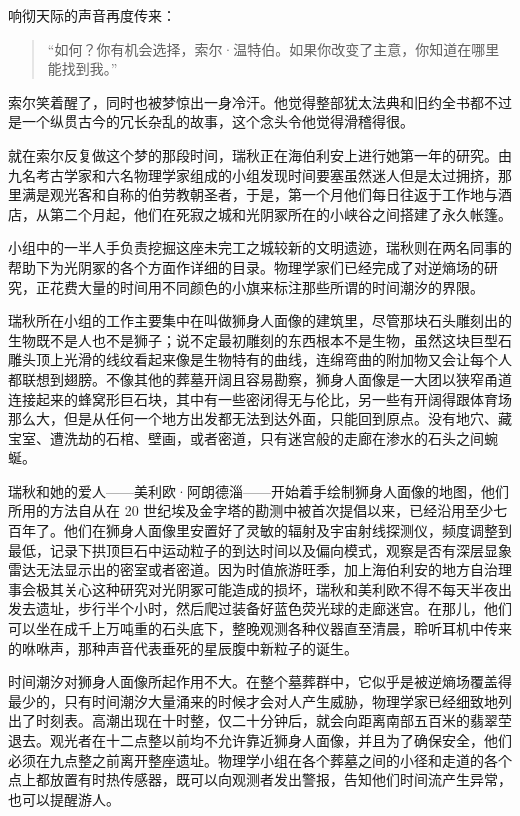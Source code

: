 \documentclass[AutoFakeBold=true]{book}
\begin{document}
响彻天际的声音再度传来：

\begin{quotation}
	{\kaishu ``如何？你有机会选择，索尔·温特伯。如果你改变了主意，你知道在哪里能找到我。''}
\end{quotation}

索尔笑着醒了，同时也被梦惊出一身冷汗。他觉得整部犹太法典和旧约全书都不过是一个纵贯古今的冗长杂乱的故事，这个念头令他觉得滑稽得很。

\vspace*{1em}

就在索尔反复做这个梦的那段时间，瑞秋正在海伯利安上进行她第一年的研究。由九名考古学家和六名物理学家组成的小组发现时间要塞虽然迷人但是太过拥挤，那里满是观光客和自称的伯劳教朝圣者，于是，第一个月他们每日往返于工作地与酒店，从第二个月起，他们在死寂之城和光阴冢所在的小峡谷之间搭建了永久帐篷。

小组中的一半人手负责挖掘这座未完工之城较新的文明遗迹，瑞秋则在两名同事的帮助下为光阴冢的各个方面作详细的目录。物理学家们已经完成了对逆熵场的研究，正花费大量的时间用不同颜色的小旗来标注那些所谓的时间潮汐的界限。

瑞秋所在小组的工作主要集中在叫做狮身人面像的建筑里，尽管那块石头雕刻出的生物既不是人也不是狮子；说不定最初雕刻的东西根本不是生物，虽然这块巨型石雕头顶上光滑的线纹看起来像是生物特有的曲线，连绵弯曲的附加物又会让每个人都联想到翅膀。不像其他的葬墓开阔且容易勘察，狮身人面像是一大团以狭窄甬道连接起来的蜂窝形巨石块，其中有一些密闭得无与伦比，另一些有开阔得跟体育场那么大，但是从任何一个地方出发都无法到达外面，只能回到原点。没有地穴、藏宝室、遭洗劫的石棺、壁画，或者密道，只有迷宫般的走廊在渗水的石头之间蜿蜒。

瑞秋和她的爱人——美利欧·阿朗德淄——开始着手绘制狮身人面像的地图，他们所用的方法自从在 20 世纪埃及金字塔的勘测中被首次提倡以来，已经沿用至少七百年了。他们在狮身人面像里安置好了灵敏的辐射及宇宙射线探测仪，频度调整到最低，记录下拱顶巨石中运动粒子的到达时间以及偏向模式，观察是否有深层显象雷达无法显示出的密室或者密道。因为时值旅游旺季，加上海伯利安的地方自治理事会极其关心这种研究对光阴冢可能造成的损坏，瑞秋和美利欧不得不每天半夜出发去遗址，步行半个小时，然后爬过装备好蓝色荧光球的走廊迷宫。在那儿，他们可以坐在成千上万吨重的石头底下，整晚观测各种仪器直至清晨，聆听耳机中传来的咻咻声，那种声音代表垂死的星辰腹中新粒子的诞生。

时间潮汐对狮身人面像所起作用不大。在整个墓葬群中，它似乎是被逆熵场覆盖得最少的，只有时间潮汐大量涌来的时候才会对人产生威胁，物理学家已经细致地列出了时刻表。高潮出现在十时整，仅二十分钟后，就会向距离南部五百米的翡翠茔退去。观光者在十二点整以前均不允许靠近狮身人面像，并且为了确保安全，他们必须在九点整之前离开整座遗址。物理学小组在各个葬墓之间的小径和走道的各个点上都放置有时热传感器，既可以向观测者发出警报，告知他们时间流产生异常，也可以提醒游人。
\end{document}
